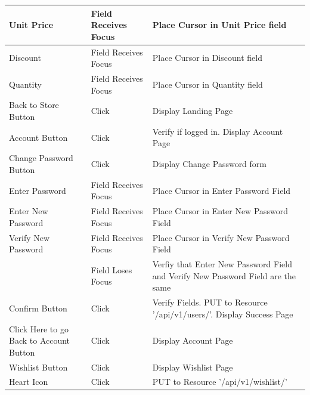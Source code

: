 \documentclass{report}
\begin{document}
\begin{center}
	\begin{tabular}{ m{1.5in} | m{1.5in} | m{1.5in} }
	Unit Price 			& Field Receives Focus 	& Place Cursor in Unit Price field \\
	\hline
	Discount 			& Field Receives Focus 	& Place Cursor in Discount field \\
	\hline
	Quantity 			& Field Receives Focus 	& Place Cursor in Quantity field \\
	\hline
	Back to Store Button & Click 				& Display Landing Page \\
	\hline
	Account Button 		& Click 					& Verify if logged in. Display Account Page \\
	\hline
	Change Password Button & Click 				& Display Change Password form \\
	\hline
	Enter Password 		& Field Receives Focus 	& Place Cursor in Enter Password Field \\
	\hline
	Enter New Password 	& Field Receives Focus 	& Place Cursor in Enter New Password Field \\
	\hline
	Verify New Password 	& Field Receives Focus 	& Place Cursor in Verify New Password Field \\ \cline{2-3}
						& Field Loses Focus 		& Verfiy that Enter New Password Field and Verify New Password Field are the same \\
	\hline
	Confirm Button 		& Click 					& Verify Fields. PUT to Resource '/api/v1/users/'. Display Success Page \\
	\hline
	Click Here to go Back to Account Button & Click & Display Account Page \\
	\hline
	Wishlist Button 		& Click 					& Display Wishlist Page \\
	\hline
	Heart Icon 			& Click 					& PUT to Resource '/api/v1/wishlist/' \\	
	\end{tabular}
		
	\newpage	
	

\end{center}
\end{document}
